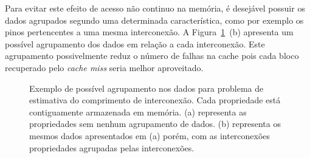Para evitar este efeito de acesso não continuo na memória, é desejável possuir os dados agrupados segundo uma determinada característica, como por exemplo os pinos pertencentes a uma mesma interconexão. A Figura~\ref{fig:sorting_data_example}~(b) apresenta um possível agrupamento dos dados em relação a cada interconexão.
Este agrupamento possivelmente reduz o número de falhas na cache pois cada bloco recuperado pelo \textit{cache miss} seria melhor aproveitado.


\begin{figure}[t]
    \centering

    \caption[Exemplo de agrupamento dos dados]{Exemplo de possível agrupamento nos dados para problema de estimativa do comprimento de interconexão. Cada propriedade está contiguamente armazenada em memória. (a) representa as propriedades sem nenhum agrupamento de dados. (b) representa os mesmos dados apresentados em (a) porém, com as interconexões propriedades agrupadas pelas interconexões.}
    \label{fig:sorting_data_example}
\end{figure}
